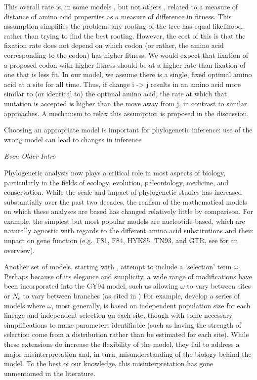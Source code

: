 \documentclass[12pt,letterpaper]{article}
\renewcommand{\subsection}[1]{%
\bigskip
\begin{center}
\begin{large}
\normalfont\itshape #1
\end{large}
\end{center}}
\newcommand{\Ne}{\ensuremath{{N_e}}\xspace} %
\begin{document}
{This overall rate is, in some models \citep{PlaceHolderRef}, but not others \citep{PlaceHolderRef}, related to a measure of distance of amino acid properties as a measure of difference in fitness.
This assumption simplifies the problem: any rooting of the tree has equal likelihood, rather than trying to find the best rooting.
However, the cost of this is that the fixation rate does not depend on which codon (or rather, the amino acid corresponding to the codon) has higher fitness.
We would expect that fixation of a proposed codon with higher fitness should be at a higher rate than fixation of one that is less fit.
In our model, we assume there is a single, fixed optimal amino acid at a site for all time.
Thus, if change i -> j results in an amino acid more similar to (or identical to) the optimal amino acid, the rate at which that mutation is accepted is higher than the move away from j, in contrast to similar approaches.
A mechanism to relax this assumption is proposed in the discussion.

Choosing an appropriate model is important for phylogenetic inference: use of the wrong model can lead to changes in inference


\pagebreak
\subsection{Even Older Intro}
Phylogenetic analysis now plays a critical role in most aspects of biology, particularly in the fields of ecology, evolution, paleontology, medicine, and conservation.
While the scale and impact of phylogenetic studies has increased substantially over the past two decades, the realism of the mathematical models on which these analyses are based has changed relatively little by comparison.
For example, the simplest but most popular models are nucleotide-based, which are naturally agnostic with regards to the different amino acid substitutions and their impact on gene function (e.g.~F81, F84, HYK85, TN93, and GTR, see \citet{Yang2014} for an overview).

Another set of models, starting with \citep[][commonly represented as GY94]{GoldmanAndYang1994}, attempt to include a `selection' term $\omega$.
Perhaps because of its elegance and simplicity, a wide range of modifications have been incorporated into the GY94 model, such as allowing $\omega$ to vary between sites or \Ne to vary between branches (as cited in \citet{Anisimova2012})
For example, \citet{NielsenAndYang2003} develop a series of models where $\omega$, most generally, is based on independent population size for each lineage and independent selection on each site, though with some necessary simplifications to make parameters identifiable (such as having the strength of selection come from a distribution rather than be estimated for each site).
While these extensions do increase the flexibility of the model, they fail to address a major misinterpretation and, in turn, misunderstanding of the biology behind the model.
To the best of our knowledge, this misinterpretation has gone unmentioned in the literature.

}
\end{document}
